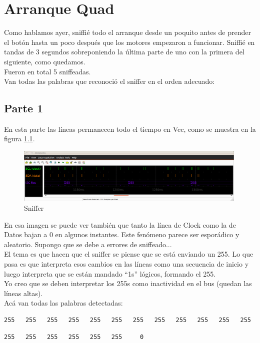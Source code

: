 \documentclass[spanish,12pt,a4paper,titlepage]{report}
\begin{document}
\chapter{Arranque Quad}

Como hablamos ayer, sniffié todo el arranque desde un poquito antes de prender el botón hasta un poco después que los motores empezaron a funcionar. Sniffié en tandas de 3 segundos sobreponiendo la última parte de uno con la primera del siguiente, como quedamos.\\
Fueron en total 5 sniffeadas.\\
Van todas las palabras que reconoció el sniffer en el orden adecuado:

\section*{Parte 1}

En esta parte las líneas permanecen todo el tiempo en Vcc, como se muestra en la figura \ref{fig:chrono}.

\begin{figure}[h!]
	\centering
	\includegraphics[width=0.99\textwidth]{./Pics/chrono.png}
	\caption{Sniffer}
	\label{fig:chrono}
\end{figure}

En esa imagen se puede ver también que tanto la línea de Clock como la de Datos bajan a 0 en algunos instantes. Este fenómeno parece ser esporádico y aleatorio. Supongo que se debe a errores de sniffeado...\\
El tema es que hacen que el sniffer se piense que se está enviando un 255. Lo que pasa es que interpreta esos cambios en las líneas como una secuencia de inicio y luego interpreta que se están mandado ``1s'' lógicos, formando el 255.\\
Yo creo que se deben interpretar los 255s como inactividad en el bus (quedan las líneas altas).\\
Acá van todas las palabras detectadas:

\begin{verbatim}
255   255   255   255   255   255   255   255   255   255   255   255
\end{verbatim}
\begin{verbatim}
255   255   255   255   255   255     0
\end{verbatim}
\end{document}
